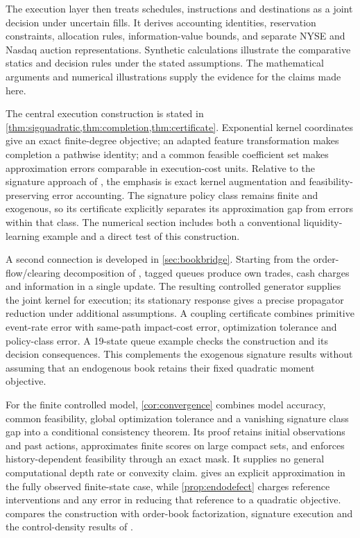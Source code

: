 \documentclass[11pt]{article}
\numberwithin{equation}{section}
\theoremstyle{definition}
\theoremstyle{remark}
\theoremstyle{definition}
\begin{document}
The execution layer then treats schedules, instructions and destinations as a
joint decision under uncertain fills. It derives accounting identities,
reservation constraints, allocation rules, information-value bounds, and separate
NYSE and Nasdaq auction representations. Synthetic calculations illustrate the
comparative statics and decision rules under the stated assumptions.
The mathematical arguments and numerical illustrations supply the evidence
for the claims made here.

The central execution construction is stated in
\cref{thm:sigquadratic,thm:completion,thm:certificate}. Exponential kernel
coordinates give an exact finite-degree objective; an adapted feature
transformation makes completion a pathwise identity; and a common feasible
coefficient set makes approximation errors comparable in execution-cost
units. Relative to the signature approach of \citet{kalsi2020}, the emphasis
is exact kernel augmentation and feasibility-preserving error accounting.
The signature policy class remains finite and exogenous, so its certificate explicitly
separates its approximation gap from errors within that class. The numerical
section includes both a conventional liquidity-learning example and a direct
test of this construction.

A second connection is developed in \cref{sec:bookbridge}. Starting from the
order-flow/clearing decomposition of \citet{contdegondxuan2025}, tagged
queues produce own trades, cash charges and information in a single update.
The resulting controlled generator supplies the joint kernel for execution;
its stationary response gives a precise propagator reduction under additional
assumptions. A coupling certificate combines primitive event-rate error with
same-path impact-cost error, optimization tolerance and policy-class error.
A 19-state queue example checks the construction and its decision consequences.
This complements the exogenous signature results without assuming that an
endogenous book retains their fixed quadratic moment objective.

For the finite controlled model, \cref{cor:convergence} combines model
accuracy, common feasibility, global optimization tolerance and a vanishing
signature class gap into a conditional consistency theorem. Its proof
retains initial observations and past actions, approximates finite scores on
large compact sets, and enforces history-dependent feasibility through an
exact mask. It supplies no general computational depth rate or convexity
claim.  gives an explicit approximation in the fully
observed finite-state case, while \cref{prop:endodefect} charges reference
interventions and any error in reducing that reference to a quadratic
objective.  compares the construction with order-book
factorization, signature execution and the control-density results of
\citet{bank2025signatures}.
\end{document}
